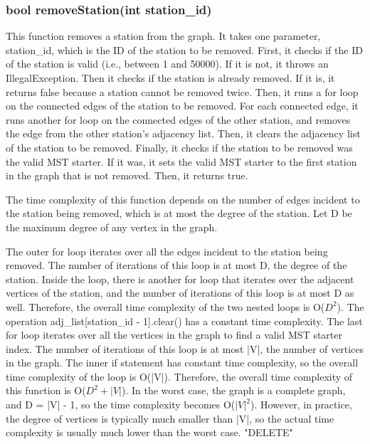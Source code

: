 \documentclass[a4paper]{article}
\begin{document}
		\subsubsection{{\color{orange}bool} {\color{draculapurple}removeStation}({\color{draculapurple}int} station\_id)}
			
			This function removes a station from the graph. It takes one parameter, {\color{draculapurple}station\_id}, which is the ID of the station to be removed.
			First, it checks if the ID of the station is valid (i.e., between 1 and 50000). If it is not, it throws an {\color{draculapurple}IllegalException}.
			Then it checks if the station is already removed. If it is, it returns {\color{draculapurple}false} because a station cannot be removed twice.
			Then, it runs a for loop on the connected edges of the station to be removed. For each connected edge, it runs another for loop on the connected edges of the other station, and removes the edge from the other station's adjacency list.
			Then, it clears the adjacency list of the station to be removed.
			Finally, it checks if the station to be removed was the valid MST starter. If it was, it sets the valid MST starter to the first station in the graph that is not removed.
			Then, it returns {\color{draculapurple}true}.

			The time complexity of this function depends on the number of edges incident to the station being removed, which is at most the degree of the station. Let D be the maximum degree of any vertex in the graph.

			The outer for loop iterates over all the edges incident to the station being removed. The number of iterations of this loop is at most {\color{draculapurple}D}, the degree of the station. Inside the loop, there is another for loop that iterates over the adjacent vertices of the station, and the number of iterations of this loop is at most {\color{draculapurple}D} as well. Therefore, the overall time complexity of the two nested loops is {\color{lightblue}O($D^2$)}.
			The operation {\color{draculapurple}adj\_list[station\_id - 1].clear()} has a constant time complexity.
			The last for loop iterates over all the vertices in the graph to find a valid MST starter index. The number of iterations of this loop is at most {\color{draculapurple}|V|}, the number of vertices in the graph. The inner if statement has constant time complexity, so the overall time complexity of the loop is {\color{lightblue}O(|V|)}.
			Therefore, the overall time complexity of this function is {\color{lightblue}O($D^2 + |V|$)}.
			In the worst case, the graph is a complete graph, and {\color{draculapurple}D = |V| - 1}, so the time complexity becomes {\color{lightblue}O($|V|^2$)}. However, in practice, the degree of vertices is typically much smaller than {\color{draculapurple}|V|}, so the actual time complexity is usually much lower than the worst case.
			{\color{GoldenYellow}"DELETE"}
\end{document}
